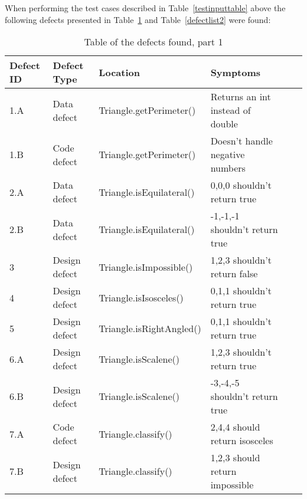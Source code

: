 When performing the test cases described in Table~\ref{testinputtable} above the following defects presented in Table~\ref{defectlist1} and Table~\ref{defectlist2} were found:

\begin{table}[!htb]
\centering
\caption{Table of the defects found, part 1}
\label{defectlist1}
\begin{tabular}{|l|l|l|l|l|l|}
\hline  Defect ID & Defect Type   & Location  & Symptoms\\ \hline
1.A       & Data defect   & Triangle.getPerimeter()  & Returns an int instead of double \\
1.B       & Code defect   & Triangle.getPerimeter()  & Doesn't handle negative numbers  \\
2.A       & Data defect   & Triangle.isEquilateral() & 0,0,0 shouldn't return true      \\
2.B       & Data defect   & Triangle.isEquilateral() & -1,-1,-1 shouldn't return true   \\
3         & Design defect & Triangle.isImpossible()  & 1,2,3 shouldn't return false     \\
4         & Design defect & Triangle.isIsosceles()   & 0,1,1 shouldn't return true      \\
5         & Design defect & Triangle.isRightAngled() & 0,1,1 shouldn't return true      \\
6.A       & Design defect & Triangle.isScalene()     & 1,2,3 shouldn't return true      \\
6.B       & Design defect & Triangle.isScalene()     & -3,-4,-5 shouldn't return true   \\
7.A       & Code defect   & Triangle.classify()      & 2,4,4 should return isosceles    \\
7.B       & Design defect & Triangle.classify()      & 1,2,3 should return impossible   \\         \hline     
\end{tabular}
\end{table}

